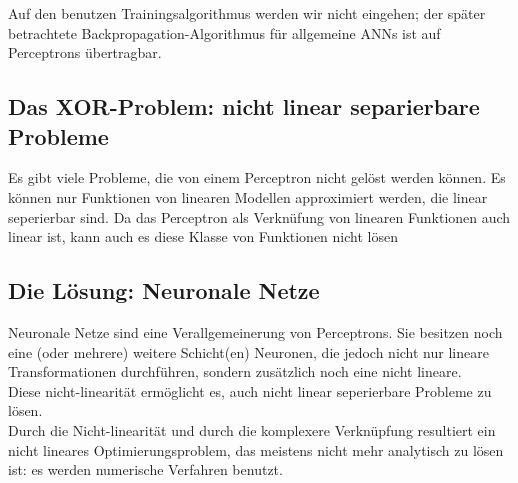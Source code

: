 Auf den benutzen Trainingsalgorithmus werden wir nicht eingehen; der später betrachtete Backpropagation-Algorithmus für allgemeine ANNs ist auf Perceptrons übertragbar.

\subsection{Das XOR-Problem: nicht linear separierbare Probleme}
Es gibt viele Probleme, die von einem Perceptron nicht gelöst werden können. Es können nur Funktionen von linearen Modellen approximiert werden, die linear seperierbar sind. Da das Perceptron als Verknüfung von linearen Funktionen auch linear ist, kann auch es diese Klasse von Funktionen nicht lösen

\subsection{Die Lösung: Neuronale Netze}
Neuronale Netze sind eine Verallgemeinerung von Perceptrons. Sie besitzen noch eine (oder mehrere) weitere Schicht(en) Neuronen, die jedoch nicht nur lineare Transformationen durchführen, sondern zusätzlich noch eine nicht lineare. \\

Diese nicht-linearität ermöglicht es, auch nicht linear seperierbare Probleme zu lösen.\\

Durch die Nicht-linearität und durch die komplexere Verknüpfung resultiert ein nicht lineares Optimierungsproblem, das meistens nicht mehr analytisch zu lösen ist: es werden numerische Verfahren benutzt.


